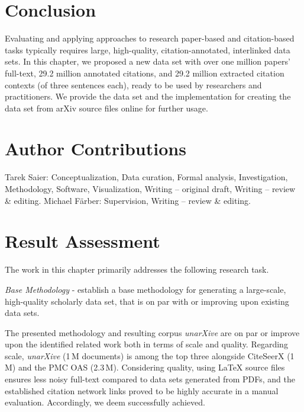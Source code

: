 \section{Conclusion}
\label{sec:conclusion}

Evaluating and applying approaches to research paper-based and citation-based tasks typically requires large, high-quality, citation-annotated, interlinked data sets. In this chapter, we proposed a new data set with over one million papers' full-text, 29.2 million annotated citations, and 29.2 million extracted citation contexts (of three sentences each), ready to be used by researchers and practitioners.
We provide the data set and the implementation for creating the data set from arXiv source files online for further usage.


\section*{Author Contributions}  %
Tarek Saier: Conceptualization, Data curation, Formal analysis, Investigation, Methodology, Software, Visualization, Writing -- original draft, Writing -- review \& editing. Michael F{\"a}rber: Supervision, Writing -- review \& editing.

\section{Result Assessment}
\label{sec:corpus-assessment}

The work in this chapter primarily addresses the following research task.

\begin{rtlist}
    \item \textit{Base Methodology} - establish a base methodology for generating a large-scale, high-quality scholarly data set, that is on par with or improving upon existing data sets.
\end{rtlist}

The presented methodology and resulting corpus \emph{unarXive} are on par or improve upon the identified related work both in terms of scale and quality. Regarding scale, \emph{unarXive} (1\,M documents) is among the top three alongside CiteSeerX (1\,M) and the PMC OAS (2.3\,M). Considering quality, using \LaTeX{} source files ensures less noisy full-text compared to data sets generated from PDFs, and the established citation network links proved to be highly accurate in a manual evaluation. Accordingly, we deem  successfully achieved.

